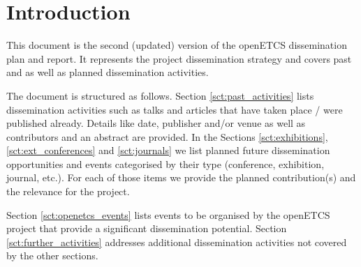 \section{Introduction}

This document is the second (updated) version of the openETCS dissemination plan and report. It represents the project dissemination strategy and covers past and as well as planned dissemination activities.

The document is structured as follows. Section \ref{sct:past_activities} lists dissemination activities such as talks and articles that have taken place / were published already. Details like date, publisher and/or venue as well as contributors and an abstract are provided. In the Sections \ref{sct:exhibitions}, \ref{sct:ext_conferences} and \ref{sct:journals} we list planned future dissemination opportunities and events categorised by their type (conference, exhibition, journal, etc.). For each of those items we provide the planned contribution(s) and the relevance for the project.

Section \ref{sct:openetcs_events} lists events to be organised by the openETCS project that provide a significant dissemination potential. Section \ref{sct:further_activities} addresses additional dissemination activities not covered by the other sections.
